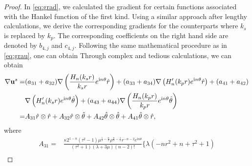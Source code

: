 \documentclass[11pt,reqno,twoside]{amsart}
\theoremstyle{definition}
\theoremstyle{remark}
\numberwithin{equation}{section}
\newcommand{\bu}{\mathbf{u}}
\begin{document}
\begin{proof}
				In \eqref{eq:grad}, we calculated the gradient for certain functions associated with the Hankel function of the first kind. Using a similar approach after lengthy calculations, we derive the corresponding gradients for the counterparts where \( k_{s} \) is replaced by \( k_{p} \). The corresponding coefficients on the right hand side are denoted by \( b_{4,j} \) and \( c_{4,j} \). Following the same mathematical procedure as in \eqref{eq:grau}, one can obtain 
				\fi
				Through complex and tedious calculations, we can obtain
				\begin{align}
					\nabla \bu^{s}=
					&(a_{31}+a_{32})\nabla \left ( \frac{H_{n} (k_{s} r )}{{k_{s}}r} e^{\mathrm{i}n\theta } \hat{r} \right )+(a_{33}+a_{34}) \nabla \left(H_{n}' ({k_{p} } r ) e^{\mathrm{i}n\theta } \hat{r}\right)+(a_{41}+a_{42})\notag \\
					&\nabla \left(H_{n}' ({k_{s} } r ) e^{\mathrm{i}n\theta } \hat{\theta }\right)+(a_{43}+a_{44})\nabla \left ( \frac{H_{n} ({k_{p} } r )}{{k_{p}}r} e^{\mathrm{i}n\theta }\hat{\theta }  \right )\label{eq:graus}\\
					=&A_{31}\hat{r}\otimes \hat{r} +A_{32}\hat{r}\otimes \hat{\theta }+A_{42}\hat{\theta }\otimes \hat{\theta }+A_{41}\hat{\theta }\otimes \hat{r },\notag
				\end{align}
				where
				\begin{align}\label{eq:graxs}
					A_{31}=&\frac{\kappa 2^{1-n} \left(\tau ^2-1\right) \mu ^{\frac{1}{2}-\frac{n}{2}} \rho ^{\frac{n}{2}-\frac{1}{2}} r^{-n-2} e^{\mathrm{i} n\theta  } }{\left(\tau ^2+1\right) (\lambda +3 \mu )  (n-2)!}\Big\{\lambda  \left(-n r^2+n+\tau ^2+1\right)\\

\end{align}
\end{proof}
\end{document}
